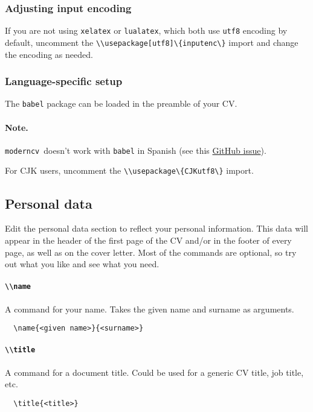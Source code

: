 \documentclass[a4paper, 11pt]{article}
\newcommand{\note}{\paragraph{Note.}}
\newcommand{\code}[1]{\lstinline!#1!}
\newcommand{\moderncv}{\code{moderncv}}
\newcommand{\Moderncv}{\moderncv~}
\begin{document}
\subsubsection*{Adjusting input encoding}
If you are not using \code{xelatex} or \code{lualatex}, which both use \code{utf8} encoding by default, uncomment the \code{\\usepackage[utf8]\{inputenc\}} import and change the encoding as needed.

\subsubsection{Language-specific setup}
The \code{babel} package can be loaded in the preamble of your CV.

\note \Moderncv doesn't work with \code{babel} in Spanish (see this \href{https://github.com/moderncv/moderncv/issues/103}{GitHub issue}).

For CJK users, uncomment the \code{\\usepackage\{CJKutf8\}} import.

\subsection{Personal data}
Edit the personal data section to reflect your personal information.
This data will appear in the header of the first page of the CV and/or in the footer of every page, as well as on the cover letter.
Most of the commands are optional, so try out what you like and see what you need.

\paragraph{\code{\\name}}
A command for your name. Takes the given name and surname as arguments.
\begin{lstlisting}
  \name{<given name>}{<surname>}
\end{lstlisting}

\paragraph{\code{\\title}}
A command for a document title. Could be used for a generic CV title, job title, etc.
\begin{lstlisting}
  \title{<title>}
\end{lstlisting}
\end{document}
